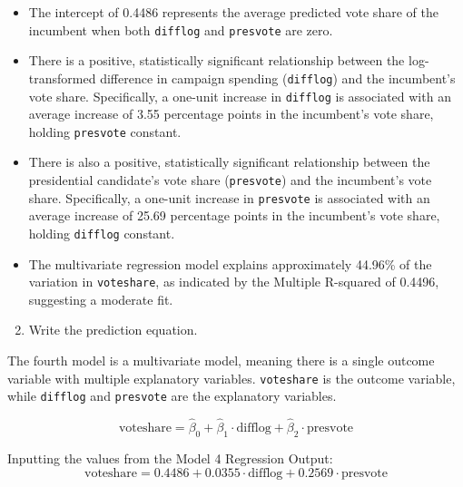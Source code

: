 \documentclass[12pt,letterpaper]{article}
\begin{document}
\vspace{0.5cm} \begin{itemize}[left=0pt, label=\textbullet]
	\item The intercept of 0.4486 represents the average predicted vote share of the incumbent when both \texttt{difflog} and \texttt{presvote} are zero.
	\item There is a positive, statistically significant relationship between the log-transformed difference in campaign spending (\texttt{difflog}) and the incumbent’s vote share. Specifically, a one-unit increase in \texttt{difflog} is associated with an average increase of 3.55 percentage points in the incumbent’s vote share, holding \texttt{presvote} constant.
	\item There is also a positive, statistically significant relationship between the presidential candidate’s vote share (\texttt{presvote}) and the incumbent’s vote share. Specifically, a one-unit increase in \texttt{presvote} is associated with an average increase of 25.69 percentage points in the incumbent’s vote share, holding \texttt{difflog} constant.
	\item The multivariate regression model explains approximately 44.96\% of the variation in \texttt{voteshare}, as indicated by the Multiple R-squared of 0.4496, suggesting a moderate fit.
\end{itemize}


\noindent\begin{enumerate}[left=0pt]
\setcounter{enumi}{1}	
\item Write the prediction equation.
\end{enumerate}

\vspace{0.25cm}
\noindent The fourth model is a multivariate model, meaning there is a single outcome variable with multiple explanatory variables. \texttt{voteshare} is the outcome variable, while \texttt{difflog} and \texttt{presvote} are the explanatory variables.

\begin{equation}
	\text{voteshare} = \hat{\beta}_0 + \hat{\beta}_1 \cdot \text{difflog} + \hat{\beta}_2 \cdot \text{presvote}
\end{equation}

\vspace{0.5cm} \noindent Inputting the values from the Model 4 Regression Output:
\begin{equation}
	\text{voteshare} = 0.4486 + 0.0355 \cdot \text{difflog} + 0.2569 \cdot \text{presvote}
\end{equation}
\end{document}
